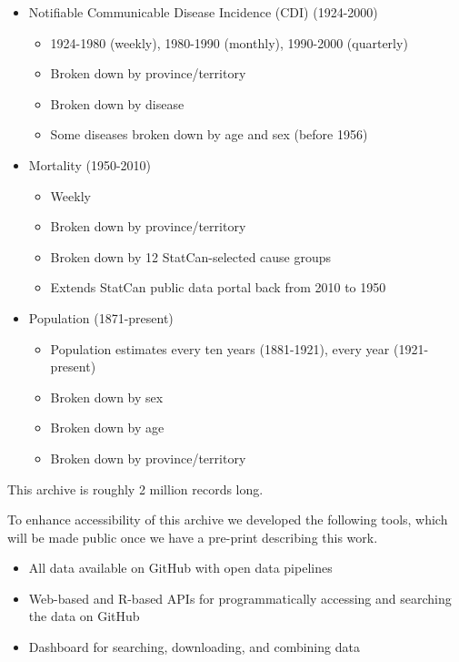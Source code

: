 \documentclass{article}
\begin{document}
\begin{itemize}
  \item Notifiable Communicable Disease Incidence (CDI) (1924-2000)
    \begin{itemize}
      \item 1924-1980 (weekly), 1980-1990 (monthly), 1990-2000 (quarterly)
      \item Broken down by province/territory
      \item Broken down by disease
      \item Some diseases broken down by age and sex (before 1956)
    \end{itemize}
  \item Mortality (1950-2010)
    \begin{itemize}
      \item Weekly
      \item Broken down by province/territory
      \item Broken down by 12 StatCan-selected cause groups
      \item Extends StatCan public data portal back from 2010 to 1950
    \end{itemize}
  \item Population (1871-present)
    \begin{itemize}
      \item Population estimates every ten years (1881-1921), every year (1921-present)
      \item Broken down by sex
      \item Broken down by age
      \item Broken down by province/territory
    \end{itemize}
\end{itemize}

This archive is roughly 2 million records long.

To enhance accessibility of this archive we developed the following tools, which will be made public once we have a pre-print describing this work.

\begin{itemize}
  \item All data available on GitHub with open data pipelines
  \item Web-based and R-based APIs for programmatically accessing and searching the data on GitHub
  \item Dashboard for searching, downloading, and combining data
\end{itemize}
\end{document}
